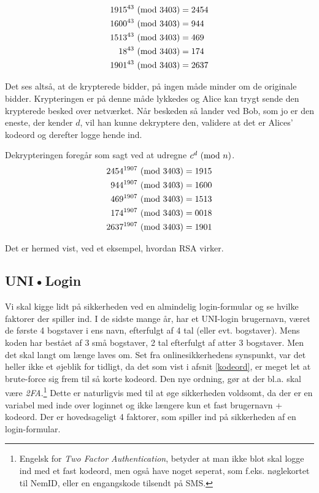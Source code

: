 \begin{eks}
    \begin{align*}
        1915^{43} \ (\mathrm{mod}\ 3403) &= 2454\\
        1600^{43} \ (\mathrm{mod}\ 3403) &= 944\\
        1513^{43} \ (\mathrm{mod}\ 3403) &= 469\\
        18^{43} \ (\mathrm{mod}\ 3403)   &= 174\\
        1901^{43} \ (\mathrm{mod}\ 3403) &= 2637\\
    \end{align*}

    Det ses altså, at de krypterede bidder, på ingen måde minder om de originale bidder.
    Krypteringen er på denne måde lykkedes og Alice kan trygt sende den krypterede besked over netværket.
    Når beskeden så lander ved Bob, som jo er den eneste, der kender \(d\), vil han kunne dekryptere den, validere at det er Alices' kodeord og derefter logge hende ind.

    Dekrypteringen foregår som sagt ved at udregne \(c^d \ (\mathrm{mod}\ n)\).
    \begin{align*}
        2454^{1907} \ (\mathrm{mod}\ 3403) &= 1915\\
        944^{1907} \ (\mathrm{mod}\ 3403)  &= 1600\\
        469^{1907} \ (\mathrm{mod}\ 3403)  &= 1513\\
        174^{1907} \ (\mathrm{mod}\ 3403)  &= 0018\\
        2637^{1907} \ (\mathrm{mod}\ 3403) &= 1901
    \end{align*}

    Det er hermed vist, ved et eksempel, hvordan RSA virker.
\end{eks}



\subsection{UNI•Login}
Vi skal kigge lidt på sikkerheden ved en almindelig login-formular og se hvilke faktorer der spiller ind.
I de sidste mange år, har et UNI-login brugernavn, været de første 4 bogstaver i ens navn, efterfulgt af 4 tal (eller evt. bogstaver).
Mens koden har bestået af 3 små bogstaver, 2 tal efterfulgt af atter 3 bogstaver.
Men det skal langt om længe laves om. \cite{unilogin}
Set fra onlinesikkerhedens synspunkt, var det heller ikke et øjeblik for tidligt, da det som vist i afsnit \ref{kodeord}, er meget let at brute-force sig frem til så korte kodeord.
Den nye ordning, gør at der bl.a. skal være \emph{2FA}.\footnote{Engelsk for \emph{Two Factor Authentication}, betyder at man ikke blot skal logge ind med et fast kodeord, men også have noget seperat, som f.eks. nøglekortet til NemID, eller en engangskode tilsendt på SMS.}
Dette er naturligvis med til at øge sikkerheden voldsomt, da der er en variabel med inde over loginnet og ikke længere kun et fast brugernavn + kodeord.
Der er hovedsageligt 4 faktorer, som spiller ind på sikkerheden af en login-formular.

